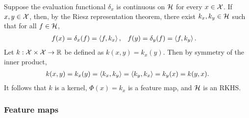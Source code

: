 Suppose the evaluation functional \(\delta_x\) is continuous on \(\mathcal{H}\) for every \(x \in \mathcal{X}\).
If \(x,y \in \mathcal{X}\), then, by the Riesz representation theorem, there exist \(k_x, k_y \in \mathcal{H}\) such that for all \(f \in \mathcal{H}\),
\begin{align}
    f(x) &= \delta_x(f) = \left\langle f, k_x \right\rangle,&
    f(y) &= \delta_y(f) = \left\langle f, k_y \right\rangle.
\end{align}
Let \(k : \mathcal{X} \times \mathcal{X} \to \mathbb{R}\) be defined as \(k(x,y) = k_x(y)\).
Then by symmetry of the inner product,
\begin{align}
    k(x,y) = k_x(y) = \left\langle k_x, k_y \right\rangle = \left\langle k_y, k_x \right\rangle = k_y(x) = k(y,x).
\end{align}
It follows that \(k\) is a kernel, \(\Phi(x) = k_x\) is a feature map, and \(\mathcal{H}\) is an RKHS.
    

\subsubsection{Feature maps}
\label{sub:feature-maps}
